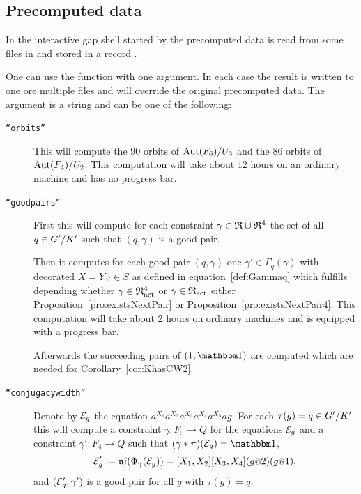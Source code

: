 \documentclass[a4paper,11pt]{amsart}
\begin{document}
\subsection{Precomputed data}\label{sec:precomputation}
In the interactive gap shell started by 
the precomputed data is read from some files in  and stored in 
a record . 

One can use the function  with one argument. In each case
the result is written to one ore multiple files and will override the original precomputed data. 
The argument is a string and can be one of the following:
\begin{description}
    \item [\texttt{``orbits''}] This will compute the $90$ orbits 
    of ${\operatorname{{Aut}}(F_6)/U_3}$ and the
		$86$ orbits of ${\operatorname{{Aut}}(F_4)/U_2}$. This computation will take
		about $12$ hours on an ordinary machine and has no progress bar.
   \item [\texttt{``goodpairs''}] First this will compute for each constraint $\gamma\in\mathfrak{R}\cup\mathfrak{R}^4$ 
		      the set of all $q\in{G'/K'}$ such that $(q,\gamma)$ is a good pair.
		      
		      Then it computes for each good pair $(q,\gamma)$ one $\gamma'\in\Gamma_q(\gamma)$
		      with decorated $X=Y_{\gamma'}\in S$ as defined in equation~\ref{def:Gammaq} which 
		      fulfills depending whether $\gamma\in\mathfrak{R}^4_{\operatorname{act}}$ or $\gamma\in\mathfrak{R}_{\operatorname{act}}$ 
		      either Proposition~\ref{pro:existsNextPair} or Proposition~\ref{pro:existsNextPair4}.
		      This computation will take about $2$ hours on ordinary machines and is equipped 
		      with a progress bar. 
		      
		      Afterwards the succeeding pairs of $(1,\id)$ are computed which are needed for 
		      Corollary~\ref{cor:KhasCW2}. 
   \item [\texttt{``conjugacywidth''}] Denote by $\mathcal{E}_g$ the equation $a^{X_1}a^{X_2}a^{X_3}a^{X_4}a^{X_5}ag$.
		      For each $\tau(g)=q\in{G'/K'}$ this will compute a constraint 
		      $\gamma\colon F_5 \to Q$ for the equations $\mathcal{E}_g$
		      and a constraint $\gamma'\colon F_4\to Q$ such that
		      $(\gamma * \pi)(\eq{E}_g) = \id$,
		      \[\eq{E}'_g := \nf(\Phi_\gamma(\eq{E}_g))=[X_1,X_2][X_3,X_4](g\at{2})(g\at{1}),\] and
		      $(\mathcal{E}'_g,\gamma')$ is a good pair for all $g$ with $\tau(g)=q$.
		      

\end{description}
\end{document}
